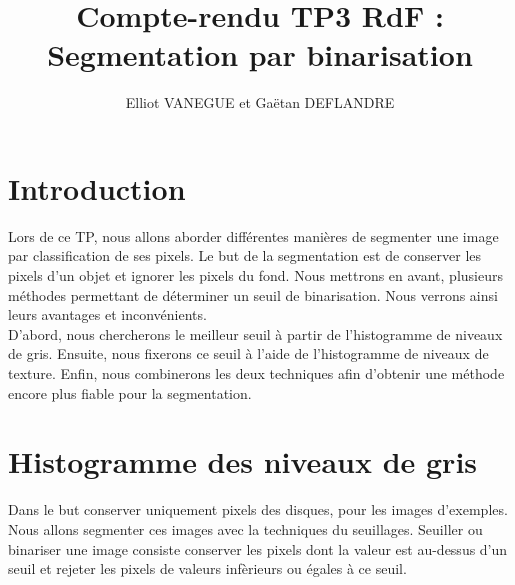 \documentclass[11pt]{article}
\title{Compte-rendu TP3 RdF : Segmentation par binarisation}
\author{Elliot VANEGUE et Gaëtan DEFLANDRE}
\begin{document}


  \maketitle
  
  \mbox{}
  \newpage
  \clearpage
  
  \section*{Introduction}
  Lors de ce TP, nous allons aborder différentes manières de segmenter une image par 
  classification de ses pixels. Le but de la segmentation est de  conserver les pixels d'un 
  objet et ignorer les pixels du fond. Nous mettrons en avant, plusieurs méthodes permettant 
  de déterminer un seuil de binarisation. Nous verrons ainsi leurs avantages et inconvénients.\\
  
  D'abord, nous chercherons le meilleur seuil à partir de l'histogramme de niveaux de gris.
  Ensuite, nous fixerons ce seuil à l'aide de l'histogramme de niveaux de texture.
  Enfin, nous combinerons les deux techniques afin d'obtenir une méthode encore plus 
  fiable pour la segmentation.\\
  
  
  
  \section{Histogramme des niveaux de gris}
  
  Dans le but conserver uniquement pixels des disques, pour les images d'exemples. Nous allons segmenter ces
  images avec la techniques du seuillages. Seuiller ou binariser une image consiste conserver les pixels dont
  la valeur est au-dessus d'un seuil et rejeter les pixels de valeurs infèrieurs ou égales à ce seuil.\\
  
\end{document}
